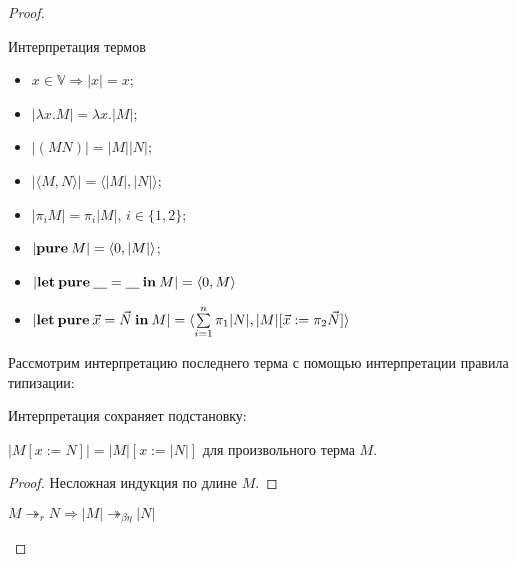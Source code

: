 \begin{proof}
\begin{defin} Интерпретация термов
  \begin{itemize}
    \item $x \in \mathbb{V} \Rightarrow |x| = x$;
    \item $|\lambda x. M| = \lambda x. |M|$;
    \item $|(M N)| = |M| |N|$;
    \item $|\langle M, N \rangle| = \langle |M|, |N| \rangle$;
    \item $|\pi_i M| = \pi_i |M|$, $i \in \{ 1, 2\}$;
    \item $|{\bf pure \:} M| = \langle 0, |M| \rangle$;
    \item $|{\bf let \: pure \:} \underline{\quad} = \underline{\quad} {\: \bf in \:} M| = \langle 0, M \rangle$
    \item $|{\bf let \: pure \:} \vec{x} = \vec{N} {\: \bf in \:} M| = \langle \sum \limits_{i = 1}^n \pi_1 |N|, |M| [\vec{x} := \pi_2 \vec{N}] \rangle$
  \end{itemize}
\end{defin}

Рассмотрим интерпретацию последнего терма с помощью интерпретации правила типизации:

\begin{prooftree}
\end{prooftree}

\begin{lemma} Интерпретация сохраняет подстановку:

  $|M [x := N]| = |M| [x := |N|]$ для произвольного терма $M$.
\end{lemma}

\begin{proof}

  Несложная индукция по длине $M$.
\end{proof}

\begin{lemma}

  $M \twoheadrightarrow_{r} N \Rightarrow |M| \twoheadrightarrow_{\beta\eta} |N|$
\end{lemma}


\end{proof}
